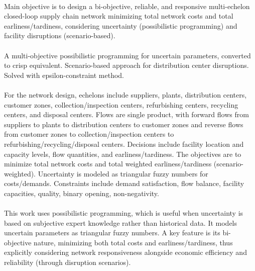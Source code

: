 \paragraph{} Main objective is to design a bi-objective, reliable, and responsive multi-echelon closed-loop supply chain network minimizing total network costs and total earliness/tardiness, considering uncertainty (possibilistic programming) and facility disruptions (scenario-based).

\paragraph{} A multi-objective possibilistic programming for uncertain parameters, converted to crisp equivalent. Scenario-based approach for distribution center disruptions. Solved with epsilon-constraint method.

\paragraph{} For the network design, echelons include suppliers, plants, distribution centers, customer zones, collection/inspection centers, refurbishing centers, recycling centers, and disposal centers. Flows are single product, with forward flows from suppliers to plants to distribution centers to customer zones and reverse flows from customer zones to collection/inspection centers to refurbishing/recycling/disposal centers. Decisions include facility location and capacity levels, flow quantities, and earliness/tardiness. The objectives are to minimize total network costs and total weighted earliness/tardiness (scenario-weighted). Uncertainty is modeled as triangular fuzzy numbers for costs/demands. Constraints include demand satisfaction, flow balance, facility capacities, quality, binary opening, non-negativity.

\paragraph{} This work uses possibilistic programming, which is useful when uncertainty is based on subjective expert knowledge rather than historical data. It models uncertain parameters as triangular fuzzy numbers. A key feature is its bi-objective nature, minimizing both total costs and earliness/tardiness, thus explicitly considering network responsiveness alongside economic efficiency and reliability (through disruption scenarios).

